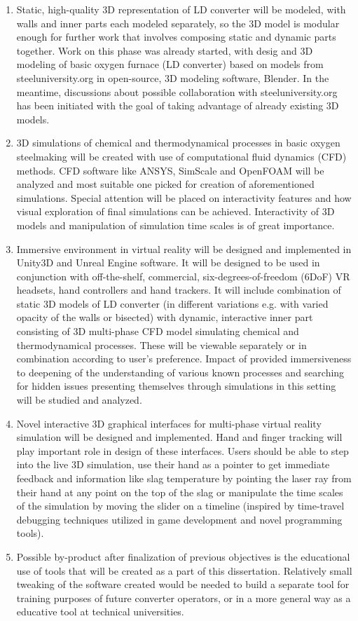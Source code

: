 \begin{enumerate}
\item{Static, high-quality 3D representation of LD converter will be modeled, with walls and inner parts each modeled separately, so the 3D model is modular enough for further work that involves composing static and dynamic parts together. Work on this phase was already started, with desig and 3D modeling of basic oxygen furnace (LD converter) based on models from steeluniversity.org in open-source, 3D modeling software, Blender. In the meantime, discussions about possible collaboration with steeluniversity.org has been initiated with the goal of taking advantage of already existing 3D models.}
\item{3D simulations of chemical and thermodynamical processes in basic oxygen steelmaking will be created with use of computational fluid dynamics (CFD) methods. CFD software like ANSYS, SimScale and OpenFOAM will be analyzed and most suitable one picked for creation of aforementioned simulations. Special attention will be placed on interactivity features and how visual exploration of final simulations can be achieved. Interactivity of 3D models and manipulation of simulation time scales is of great importance.}
\item{Immersive environment in virtual reality will be designed and implemented in Unity3D and Unreal Engine software. It will be designed to be used in conjunction with off-the-shelf, commercial, six-degrees-of-freedom (6DoF) VR headsets, hand controllers and hand trackers. It will include combination of static 3D models of LD converter (in different variations e.g. with varied opacity of the walls or bisected) with dynamic, interactive inner part consisting of 3D multi-phase CFD model simulating chemical and thermodynamical processes. These will be viewable separately or in combination according to user's preference. Impact of provided immersiveness to deepening of the understanding of various known processes and searching for hidden issues presenting themselves through simulations in this setting will be studied and analyzed.}
\item{Novel interactive 3D graphical interfaces for multi-phase virtual reality simulation will be designed and implemented. Hand and finger tracking will play important role in design of these interfaces. Users should be able to step into the live 3D simulation, use their hand as a pointer to get immediate feedback and information like slag temperature by pointing the laser ray from their hand at any point on the top of the slag or manipulate the time scales of the simulation by moving the slider on a timeline (inspired by time-travel debugging techniques utilized in game development and novel programming tools).}
\item{Possible by-product after finalization of previous objectives is the educational use of tools that will be created as a part of this dissertation. Relatively small tweaking of the software created would be needed to build a separate tool for training purposes of future converter operators, or in a more general way as a educative tool at technical universities.}
\end{enumerate}

